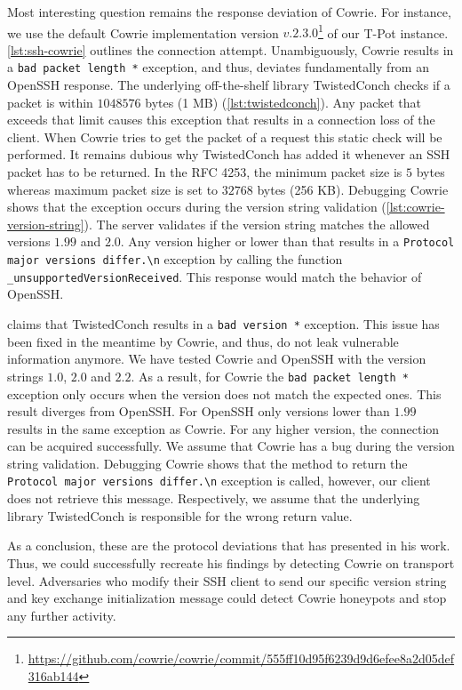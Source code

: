 Most interesting question remains the response deviation of Cowrie.
For instance, we use the default Cowrie implementation version $v.2.3.0$\footnote{\url{https://github.com/cowrie/cowrie/commit/555ff10d95f6239d9d6efee8a2d05def316ab144}} of our T-Pot instance.
\autoref{lst:ssh-cowrie} outlines the connection attempt.
Unambiguously, Cowrie results in a  \verb|bad packet length *| exception, and thus, deviates fundamentally from an Open\-SSH response.
The underlying off-the-shelf library TwistedConch checks if a packet is within $1048576$ bytes (1 MB) (\autoref{lst:twistedconch}).
Any packet that exceeds that limit causes this exception that results in a connection loss of the client.
When Cowrie tries to get the packet of a request this static check will be performed.
It remains dubious why TwistedConch has added it whenever an SSH packet has to be returned.
In the RFC 4253, the minimum packet size is $5$ bytes whereas maximum packet size is set to $32768$ bytes (256 KB).
Debugging Cowrie shows that the exception occurs during the version string validation (\autoref{lst:cowrie-version-string}).
The server validates if the version string matches the allowed versions $1.99$ and $2.0$.
Any version higher or lower than that results in a \verb|Protocol major versions differ.\n| exception by calling the function \verb|_unsupportedVersionReceived|.
This response would match the behavior of OpenSSH.

\citet{vetterl2020} claims that TwistedConch results in a \verb|bad version *| exception.
This issue has been fixed in the meantime by Cowrie, and thus, do not leak vulnerable information anymore.
We have tested Cowrie and OpenSSH with the version strings $1.0$, $2.0$ and $2.2$. 
As a result, for Cowrie the \verb|bad packet length *| exception only occurs when the version does not match the expected ones.
This result diverges from OpenSSH.
For OpenSSH only versions lower than $1.99$ results in the same exception as Cowrie.
For any higher version, the connection can be acquired successfully.
We assume that Cowrie has a bug during the version string validation.
Debugging Cowrie shows that the method to return the \verb|Protocol major versions differ.\n| exception is called, however, our client does not retrieve this message.
Respectively, we assume that the underlying library TwistedConch is responsible for the wrong return value.

As a conclusion, these are the protocol deviations that \citet{vetterl2020} has presented in his work.
Thus, we could successfully recreate his findings by detecting Cowrie on transport level.
Adversaries who modify their SSH client to send our specific version string and key exchange initialization message could detect Cowrie honeypots and stop any further activity.

